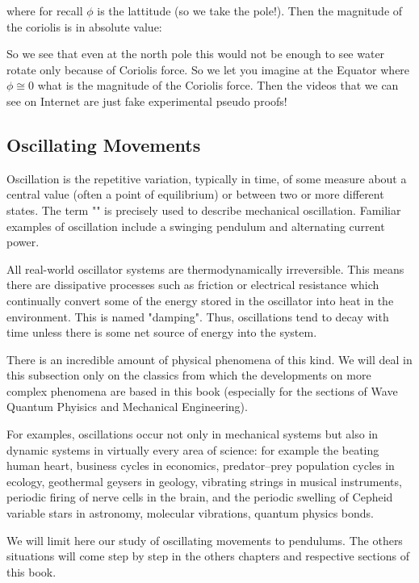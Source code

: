 	where for recall $\phi$ is the lattitude (so we take the pole!). Then the magnitude of the coriolis is in absolute value:
	
	So we see that even at the north pole this would not be enough to see water rotate only because of Coriolis force. So we let you imagine at the Equator where $\phi\cong 0$  what is the magnitude of the Coriolis force. Then the videos that we can see on Internet are just fake experimental pseudo proofs!
	
	\pagebreak
	\subsection{Oscillating Movements}
	Oscillation is the repetitive variation, typically in time, of some measure about a central value (often a point of equilibrium) or between two or more different states. The term "" is precisely used to describe mechanical oscillation. Familiar examples of oscillation include a swinging pendulum and alternating current power.
	
	All real-world oscillator systems are thermodynamically irreversible. This means there are dissipative processes such as friction or electrical resistance which continually convert some of the energy stored in the oscillator into heat in the environment. This is named "damping". Thus, oscillations tend to decay with time unless there is some net source of energy into the system.
	
	There is an incredible amount of physical phenomena of this kind. We will deal in this subsection only on the classics from which the developments on more complex phenomena are based in this book (especially for the sections of Wave Quantum Phyisics and Mechanical Engineering).

	For examples, oscillations occur not only in mechanical systems but also in dynamic systems in virtually every area of science: for example the beating human heart, business cycles in economics, predator–prey population cycles in ecology, geothermal geysers in geology, vibrating strings in musical instruments, periodic firing of nerve cells in the brain, and the periodic swelling of Cepheid variable stars in astronomy, molecular vibrations, quantum physics bonds.
	
	We will limit here our study of oscillating movements to pendulums. The others situations will come step by step in the others chapters and respective sections of this book.


